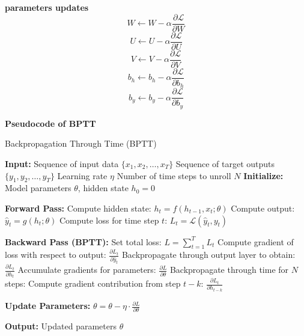 \documentclass[12pt,a4paper]{article}
\begin{document}
\textbf{parameters updates}
\begin{equation}
    W \leftarrow W - \alpha\dfrac{\partial\mathcal{L}}{\partial W}
\end{equation}
\begin{equation}
    U \leftarrow U - \alpha\dfrac{\partial\mathcal{L}}{\partial U}
\end{equation}
\begin{equation}
    V \leftarrow V - \alpha\dfrac{\partial\mathcal{L}}{\partial V}
\end{equation}
\begin{equation}
    b_h \leftarrow b_h - \alpha\dfrac{\partial\mathcal{L}}{\partial b_h}
\end{equation}
\begin{equation}
    b_y \leftarrow b_y - \alpha\dfrac{\partial\mathcal{L}}{\partial b_y}
\end{equation}

\textbf{Pseudocode of BPTT} \parencite{wikipedia2023bptt}
\begin{algorithm}[H]
    \caption{Backpropagation Through Time (BPTT)}
    \begin{algorithmic}[1]
    \STATE \textbf{Input:} 
    \STATE \hspace{1em} Sequence of input data $\{x_1, x_2, \dots, x_T\}$
    \STATE \hspace{1em} Sequence of target outputs $\{y_1, y_2, \dots, y_T\}$
    \STATE \hspace{1em} Learning rate $\eta$
    \STATE \hspace{1em} Number of time steps to unroll $N$
    \STATE \textbf{Initialize:} Model parameters $\theta$, hidden state $h_0 = 0$
    
    \STATE \textbf{Forward Pass:}
        \STATE Compute hidden state: $h_t = f(h_{t-1}, x_t; \theta)$
        \STATE Compute output: $\hat{y}_t = g(h_t; \theta)$
        \STATE Compute loss for time step $t$: $L_t = \mathcal{L}(\hat{y}_t, y_t)$
    \ENDFOR
    
    \STATE \textbf{Backward Pass (BPTT):}
    \STATE Set total loss: $L = \sum_{t=1}^{T} L_t$
        \STATE Compute gradient of loss with respect to output: $\frac{\partial L_t}{\partial \hat{y}_t}$
        \STATE Backpropagate through output layer to obtain: $\frac{\partial L_t}{\partial h_t}$
        \STATE Accumulate gradients for parameters: $\frac{\partial L}{\partial \theta}$
            \STATE Backpropagate through time for $N$ steps:
            \STATE Compute gradient contribution from step $t-k$: $\frac{\partial L_t}{\partial h_{t-k}}$
        \ENDFOR
    \ENDFOR
    
    \STATE \textbf{Update Parameters:}
    \STATE $\theta = \theta - \eta \cdot \frac{\partial L}{\partial \theta}$
    
    \STATE \textbf{Output:} Updated parameters $\theta$
    \end{algorithmic}
\end{algorithm}
\end{document}
